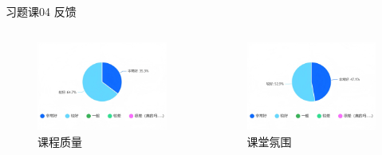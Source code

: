 \documentclass[]{beamer}
\begin{document}
\begin{frame}{习题课04 反馈}
    \begin{columns}
        \begin{column}{0.5\textwidth}
            \begin{figure}[H]
                \centering
                \includegraphics[width=1.0\linewidth]{quality.png}
                \caption{课程质量}
            \end{figure}
        \end{column}

        \begin{column}{0.5\textwidth}
            \begin{figure}[H]
                \centering
                \includegraphics[width=1.0\linewidth]{atm.png}
                \caption{课堂氛围}
            \end{figure}
        \end{column}
    \end{columns}
\end{frame}
\end{document}
